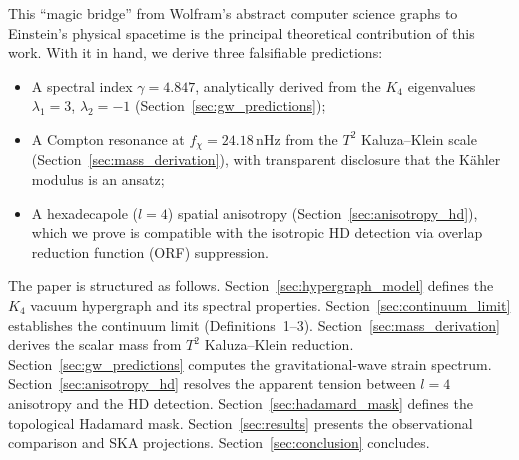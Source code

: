 This ``magic bridge'' from Wolfram's abstract computer science graphs to Einstein's physical spacetime is the principal theoretical contribution of this work.  With it in hand, we derive three falsifiable predictions:
\begin{itemize}
    \item A spectral index $\gamma = 4.847$, analytically derived from the $K_4$ eigenvalues $\lambda_1 = 3$, $\lambda_2 = -1$ (Section~\ref{sec:gw_predictions});
    \item A Compton resonance at $f_\chi = 24.18\,$nHz from the $T^2$ Kaluza--Klein scale (Section~\ref{sec:mass_derivation}), with transparent disclosure that the K\"ahler modulus is an ansatz;
    \item A hexadecapole ($l = 4$) spatial anisotropy (Section~\ref{sec:anisotropy_hd}), which we prove is compatible with the isotropic HD detection via overlap reduction function (ORF) suppression.
\end{itemize}

The paper is structured as follows.  Section~\ref{sec:hypergraph_model} defines the $K_4$ vacuum hypergraph and its spectral properties.  Section~\ref{sec:continuum_limit} establishes the continuum limit (Definitions~1--3).  Section~\ref{sec:mass_derivation} derives the scalar mass from $T^2$ Kaluza--Klein reduction.  Section~\ref{sec:gw_predictions} computes the gravitational-wave strain spectrum.  Section~\ref{sec:anisotropy_hd} resolves the apparent tension between $l=4$ anisotropy and the HD detection.  Section~\ref{sec:hadamard_mask} defines the topological Hadamard mask.  Section~\ref{sec:results} presents the observational comparison and SKA projections.  Section~\ref{sec:conclusion} concludes.
